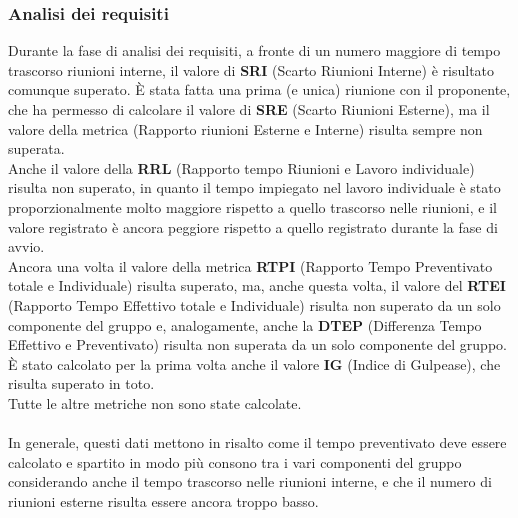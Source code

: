 \subsubsection{Analisi dei requisiti}
Durante la fase di analisi dei requisiti, a fronte di un numero maggiore di tempo trascorso riunioni interne, il valore di \textbf{SRI} (Scarto Riunioni Interne) è risultato comunque superato. È stata fatta una prima (e unica) riunione con il proponente, che ha permesso di calcolare il valore di \textbf{SRE} (Scarto Riunioni Esterne), ma il valore della metrica (Rapporto riunioni Esterne e Interne) risulta sempre non superata.\\
Anche il valore della \textbf{RRL} (Rapporto tempo Riunioni e Lavoro individuale) risulta non superato, in quanto il tempo impiegato nel lavoro individuale è stato proporzionalmente molto maggiore rispetto a quello trascorso nelle riunioni, e il valore registrato è ancora peggiore rispetto a quello registrato durante la fase di avvio. \\
Ancora una volta il valore della metrica \textbf{RTPI} (Rapporto Tempo Preventivato totale e Individuale) risulta superato, ma, anche questa volta, il valore del \textbf{RTEI} (Rapporto Tempo Effettivo totale e Individuale) risulta non superato da un solo componente del gruppo e, analogamente, anche la \textbf{DTEP} (Differenza Tempo Effettivo e Preventivato) risulta non superata da un solo componente del gruppo. \\
È stato calcolato per la prima volta anche il valore \textbf{IG} (Indice di Gulpease), che risulta superato in toto.\\
Tutte le altre metriche non sono state calcolate.\\\\
In generale, questi dati mettono in risalto come il tempo preventivato deve essere calcolato e spartito in modo più consono tra i vari componenti del gruppo considerando anche il tempo trascorso nelle riunioni interne, e che il numero di riunioni esterne risulta essere ancora troppo basso.

